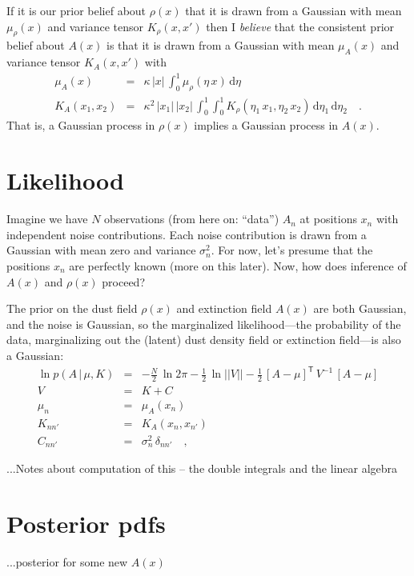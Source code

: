 \documentclass[12pt, letterpaper]{article}
\newcommand{\dd}{\mathrm{d}}
\newcommand{\given}{\,|\,}
\newcommand{\inverse}[1]{{#1}^{-1}}
\newcommand{\transpose}[1]{{#1}^{\mathsf{T}}}
\renewcommand{\det}[1]{||{#1}||}
\begin{document}
If it is our prior belief about $\rho(x)$ that it is drawn from a
Gaussian with mean $\mu_\rho(x)$ and variance tensor $K_\rho(x, x')$ then I
\emph{believe} that the consistent prior belief about $A(x)$ is that
it is drawn from a Gaussian with mean $\mu_A(x)$ and variance tensor
$K_A(x, x')$ with
\begin{eqnarray}
\mu_A(x) &=& \kappa\,|x|\,\int_0^1 \mu_\rho(\eta\,x)\,\dd\eta
\\
K_A(x_1, x_2) &=& \kappa^2\,|x_1|\,|x_2|\,\int_0^1\int_0^1 K_\rho(\eta_1\,x_1, \eta_2\,x_2)\,\dd\eta_1\,\dd\eta_2
\quad .
\end{eqnarray}
That is, a Gaussian process in $\rho(x)$ implies a Gaussian process in
$A(x)$.

\section{Likelihood}

Imagine we have $N$ observations (from here on: ``data'') $A_n$ at
positions $x_n$ with independent noise contributions.
Each noise contribution is drawn from a Gaussian with mean zero and
variance $\sigma^2_n$.
For now, let's presume that the positions $x_n$ are perfectly known
(more on this later).
Now, how does inference of $A(x)$ and $\rho(x)$ proceed?

The prior on the dust field $\rho(x)$ and extinction field $A(x)$ are
both Gaussian, and the noise is Gaussian, so the marginalized
likelihood---the probability of the data, marginalizing out the
(latent) dust density field or extinction field---is also a Gaussian:
\begin{eqnarray}
\ln p(A\given\mu,K) &=& -\frac{N}{2}\,\ln 2\pi - \frac{1}{2}\,\ln\det{V} - \frac{1}{2}\,\transpose{[A-\mu]}\,\inverse{V}\,[A-\mu]
\\
V &=& K + C
\\
\mu_n &=& \mu_A(x_n)
\\
K_{nn'} &=& K_A(x_n, x_{n'})
\\
C_{nn'} &=& \sigma^2_n\,\delta_{nn'}
\quad ,
\end{eqnarray}

...Notes about computation of this -- the double integrals and the linear algebra

\section{Posterior pdfs}

...posterior for some new $A(x)$
\end{document}
